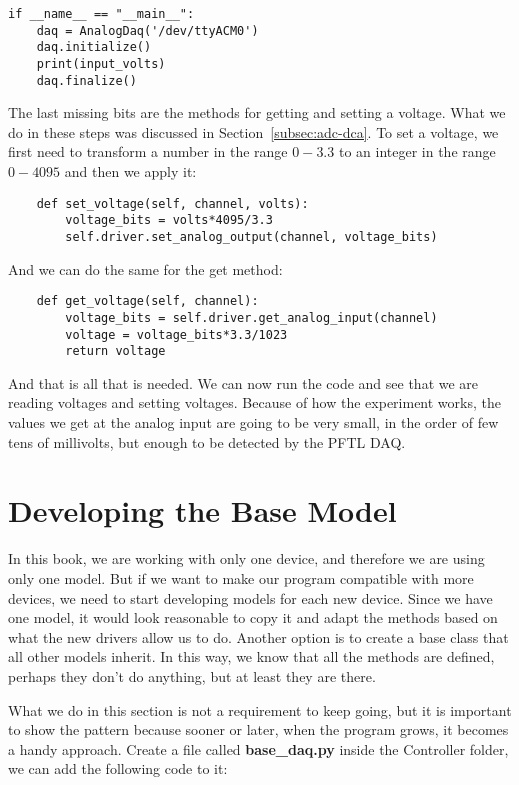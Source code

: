 \begin{verbatim}
if __name__ == "__main__":
    daq = AnalogDaq('/dev/ttyACM0')
    daq.initialize()
    print(input_volts)
    daq.finalize()
\end{verbatim}

The last missing bits are the methods for getting and setting a voltage. What we do in these steps was discussed in Section~\ref{subsec:adc-dca}. To set a voltage, we first need to transform a number in the range $0-3.3$ to an integer in the range $0-4095$ and then we apply it:

\begin{verbatim}
    def set_voltage(self, channel, volts):
        voltage_bits = volts*4095/3.3
        self.driver.set_analog_output(channel, voltage_bits)
\end{verbatim}

And we can do the same for the get method:

\begin{verbatim}
    def get_voltage(self, channel):
        voltage_bits = self.driver.get_analog_input(channel)
        voltage = voltage_bits*3.3/1023
        return voltage
\end{verbatim}

And that is all that is needed. We can now run the code and see that we are reading voltages and setting voltages. Because of how the experiment works, the values we get at the analog input are going to be very small, in the order of few tens of millivolts, but enough to be detected by the {PFTL DAQ}.

\section{Developing the Base Model}\label{sec:base-model}
In this book, we are working with only one device, and therefore we are using only one model. But if we want to make our program compatible with more devices, we need to start developing models for each new device. Since we have one model, it would look reasonable to copy it and adapt the methods based on what the new drivers allow us to do. Another option is to create a base class that all other models inherit. In this way, we know that all the methods are defined, perhaps they don't do anything, but at least they are there.

What we do in this section is not a requirement to keep going, but it is important to show the pattern because sooner or later, when the program grows, it becomes a handy approach. Create a file called \textbf{base\_daq.py} inside the Controller folder, we can add the following code to it:

